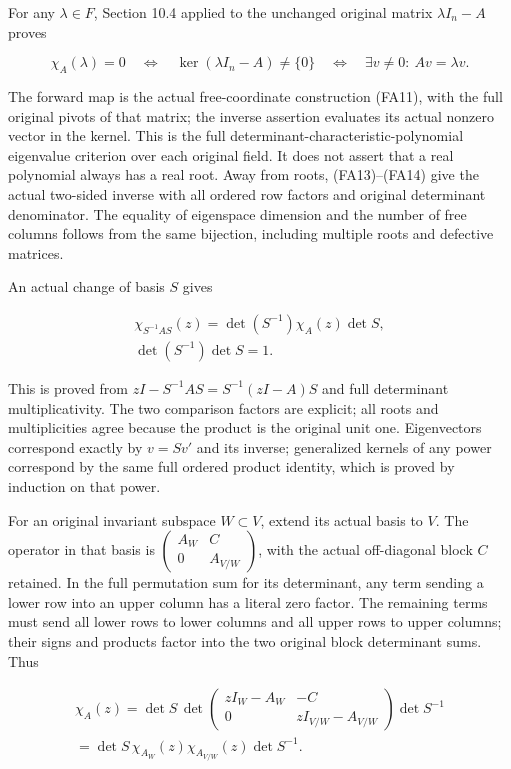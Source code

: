 \documentclass[
  11pt,
]{article}
\begin{document}
For any \(\lambda\in F\), Section 10.4 applied to the unchanged original
matrix \(\lambda I_n-A\) proves

\[
\chi_A(\lambda)=0\quad\Longleftrightarrow\quad
\ker(\lambda I_n-A)\ne\{0\}\quad\Longleftrightarrow\quad
\exists v\ne0:\ Av=\lambda v.
\tag{FA30}
\]

The forward map is the actual free-coordinate construction (FA11), with
the full original pivots of that matrix; the inverse assertion evaluates
its actual nonzero vector in the kernel. This is the full
determinant-characteristic-polynomial eigenvalue criterion over each
original field. It does not assert that a real polynomial always has a
real root. Away from roots, (FA13)--(FA14) give the actual two-sided
inverse with all ordered row factors and original determinant
denominator. The equality of eigenspace dimension and the number of free
columns follows from the same bijection, including multiple roots and
defective matrices.

An actual change of basis \(S\) gives

\[
\begin{gathered}
\chi_{S^{-1}AS}(z)=\det(S^{-1})\chi_A(z)\det S, \\ \det(S^{-1})\det S=1.
\end{gathered}
\tag{FA31}
\]

This is proved from \(zI-S^{-1}AS=S^{-1}(zI-A)S\) and full determinant
multiplicativity. The two comparison factors are explicit; all roots and
multiplicities agree because the product is the original unit one.
Eigenvectors correspond exactly by \(v=S v'\) and its inverse;
generalized kernels of any power correspond by the same full ordered
product identity, which is proved by induction on that power.

For an original invariant subspace \(W\subset V\), extend its actual
basis to \(V\). The operator in that basis is
\(\begin{pmatrix} A_W&C\\0&A_{V/W}\end{pmatrix}\), with the actual
off-diagonal block \(C\) retained. In the full permutation sum for its
determinant, any term sending a lower row into an upper column has a
literal zero factor. The remaining terms must send all lower rows to
lower columns and all upper rows to upper columns; their signs and
products factor into the two original block determinant sums. Thus

\[
\begin{gathered}
\chi_A(z)=\det S\,
 \det\begin{pmatrix}zI_W-A_W&-C\\0&zI_{V/W}-A_{V/W}\end{pmatrix}
 \det S^{-1} \\ =\det S\,\chi_{A_W}(z)\chi_{A_{V/W}}(z)\det S^{-1}.
\end{gathered}
\tag{FA32}
\]
\end{document}
